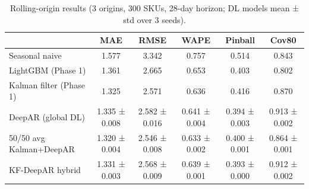 \begin{table}[t]
\caption{Rolling-origin results (3 origins, 300 SKUs, 28-day horizon; DL models mean ± std over 3 seeds).}
\label{tab:main}
\begin{tabular}{lccccc}
\toprule
 & MAE & RMSE & WAPE & Pinball & Cov80 \\
\midrule
Seasonal naive & 1.577 & 3.342 & 0.757 & 0.514 & 0.843 \\
LightGBM (Phase 1) & 1.361 & 2.665 & 0.653 & 0.403 & 0.802 \\
Kalman filter (Phase 1) & 1.325 & 2.571 & 0.636 & 0.416 & 0.870 \\
DeepAR (global DL) & 1.335 ± 0.008 & 2.582 ± 0.016 & 0.641 ± 0.004 & 0.394 ± 0.003 & 0.913 ± 0.002 \\
50/50 avg Kalman+DeepAR & 1.320 ± 0.004 & 2.546 ± 0.008 & 0.633 ± 0.002 & 0.400 ± 0.001 & 0.864 ± 0.001 \\
KF-DeepAR hybrid & 1.331 ± 0.003 & 2.568 ± 0.009 & 0.639 ± 0.001 & 0.393 ± 0.000 & 0.912 ± 0.002 \\
\bottomrule
\end{tabular}
\end{table}

